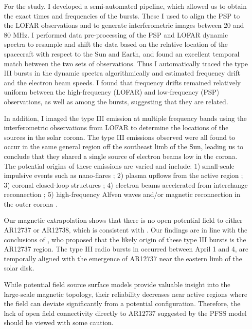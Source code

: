 For the study, I developed a semi-automated pipeline, which allowed us to obtain the exact times and frequencies of the bursts. These I used to align the PSP to the LOFAR observations and to generate interferometric images between 20 and 80 MHz. I performed data pre-processing of the PSP and LOFAR dynamic spectra to resample and shift the data based on the relative location of the spacecraft with respect to the Sun and Earth, and found an excellent temporal match between the two sets of observations. Thus I automatically traced the type III bursts in the dynamic spectra algorithmically and estimated frequency drift and the electron beam speeds. I found that frequency drifts remained relatively uniform between the high-frequency (LOFAR) and low-frequency (PSP) observations, as well as among the bursts, suggesting that they are related.

In addition, I imaged the type III emission at multiple frequency bands using the interferometric observations from LOFAR to determine the locations of the sources in the solar corona. The type III emissions observed were all found to occur in the same general region off the southeast limb of the Sun, leading us to conclude that they shared a single source of electron beams low in the corona.
The potential origins of these emissions are varied and include: 1) small-scale impulsive events such as nano-flares \citep{ishikawa_2017, che_2018, chhabra_2021}; 2) plasma upflows from the active region \citep{harra_2021}; 3) coronal closed-loop structures \citep{wu_2002}; 4) electron beams accelerated from interchange reconnection \citep{gopalswamy_2022}; 5) high-frequency Alfven waves and/or magnetic reconnection in the outer corona \citep{morton_2015, khaled_2022}.

Our magnetic extrapolation shows that there is no open potential field to either AR12737 or AR12738, which is consistent with \citet{cattell_2021}. Our findings are in line with the conclusions of \citet{harra_2021}, who proposed that the likely origin of these type III bursts is the AR12737 region. The type III radio bursts in \citet{harra_2021} occurred between April 1 and 4, are temporally aligned with the emergence of AR12737 near the eastern limb of the solar disk.

While potential field source surface models provide valuable insight into the large-scale magnetic topology, their reliability decreases near active regions where the field can deviate significantly from a potential configuration. Therefore, the lack of open field connectivity directly to AR12737 suggested by the PFSS model should be viewed with some caution.

